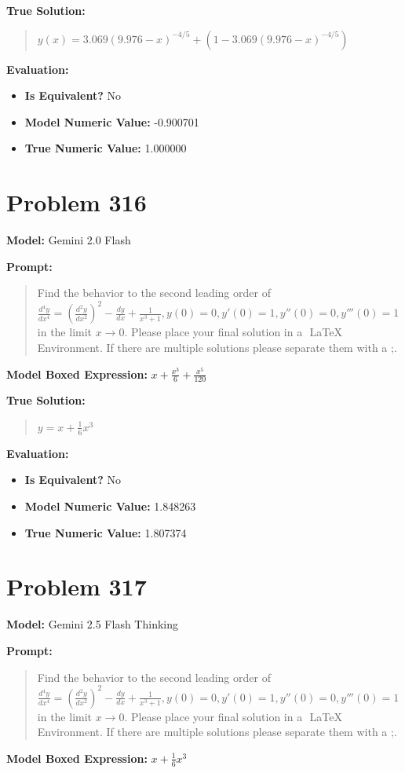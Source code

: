\documentclass{article}
\begin{document}
{\textbf{True Solution:}
\begin{quote}
$y(x) = 3.069(9.976 - x)^{-4/5} + (1 - 3.069(9.976 - x)^{-4/5})$
\end{quote}

\textbf{Evaluation:}
\begin{itemize}
\item \textbf{Is Equivalent?} No
\item \textbf{Model Numeric Value:} -0.900701
\item \textbf{True Numeric Value:} 1.000000
\end{itemize}
\vspace{1cm}
\section*{Problem 316}
\textbf{Model:} Gemini 2.0 Flash

\textbf{Prompt:}
\begin{quote}
Find the behavior to the second leading order of $\frac{d^4 y}{dx^4} = (\frac{d^2 y}{dx^2})^2 - \frac{d y}{dx}+ \frac{1}{x^3+1}, y(0)=0, y'(0)=1, y''(0)=0, y'''(0)=1$ in the limit $x \rightarrow 0$. Please place your final solution in a $\boxed{}$ LaTeX Environment. If there are multiple solutions please separate them with a ;.
\end{quote}
\textbf{Model Boxed Expression:} $x + \frac{x^3}{6} + \frac{x^5}{120}$

\textbf{True Solution:}
\begin{quote}
$y = x + \frac{1}{6}x^3$
\end{quote}

\textbf{Evaluation:}
\begin{itemize}
\item \textbf{Is Equivalent?} No
\item \textbf{Model Numeric Value:} 1.848263
\item \textbf{True Numeric Value:} 1.807374
\end{itemize}
\vspace{1cm}
\section*{Problem 317}
\textbf{Model:} Gemini 2.5 Flash Thinking

\textbf{Prompt:}
\begin{quote}
Find the behavior to the second leading order of $\frac{d^4 y}{dx^4} = (\frac{d^2 y}{dx^2})^2 - \frac{d y}{dx}+ \frac{1}{x^3+1}, y(0)=0, y'(0)=1, y''(0)=0, y'''(0)=1$ in the limit $x \rightarrow 0$. Please place your final solution in a $\boxed{}$ LaTeX Environment. If there are multiple solutions please separate them with a ;.
\end{quote}
\textbf{Model Boxed Expression:} $x + \frac{1}{6}x^3$

}
\end{document}
